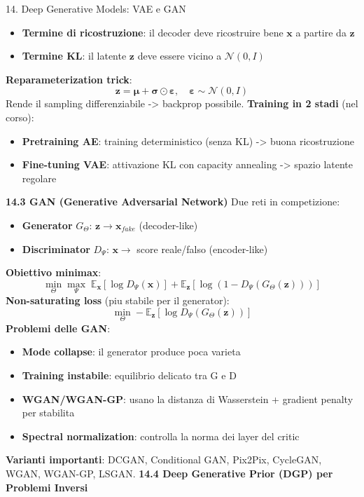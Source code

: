 \documentclass[italian,10pt]{beamer}
\begin{document}
\begin{frame}[allowframebreaks]{14. Deep Generative Models: VAE e GAN}
\begin{itemize}
\item \textbf{Termine di ricostruzione}: il decoder deve ricostruire bene $\boldsymbol{x}$ a partire da $\boldsymbol{z}$
\item \textbf{Termine KL}: il latente $\boldsymbol{z}$ deve essere vicino a $\mathcal{N}(0,I)$
\end{itemize}
\textbf{Reparameterization trick}:
\[ \boldsymbol{z} = \boldsymbol{\mu} + \boldsymbol{\sigma} \odot \boldsymbol{\varepsilon}, \quad \boldsymbol{\varepsilon} \sim \mathcal{N}(0, I) \]
Rende il sampling differenziabile -> backprop possibile.
\textbf{Training in 2 stadi} (nel corso):
\begin{itemize}
\item \textbf{Pretraining AE}: training deterministico (senza KL) -> buona ricostruzione
\item \textbf{Fine-tuning VAE}: attivazione KL con capacity annealing -> spazio latente regolare
\end{itemize}
\textbf{14.3 GAN (Generative Adversarial Network)}
Due reti in competizione:
\begin{itemize}
\item \textbf{Generator} $G_\Theta$: $\boldsymbol{z} \to \boldsymbol{x}_{fake}$ (decoder-like)
\item \textbf{Discriminator} $D_\Psi$: $\boldsymbol{x} \to$ score reale/falso (encoder-like)
\end{itemize}
\textbf{Obiettivo minimax}:
\[ \min_\Theta \max_\Psi \; \mathbb{E}_{\boldsymbol{x}}[\log D_\Psi(\boldsymbol{x})] + \mathbb{E}_{\boldsymbol{z}}[\log(1 - D_\Psi(G_\Theta(\boldsymbol{z})))] \]
\textbf{Non-saturating loss} (piu stabile per il generator):
\[ \min_\Theta -\mathbb{E}_{\boldsymbol{z}}[\log D_\Psi(G_\Theta(\boldsymbol{z}))] \]
\textbf{Problemi delle GAN}:
\begin{itemize}
\item \textbf{Mode collapse}: il generator produce poca varieta
\item \textbf{Training instabile}: equilibrio delicato tra G e D
\item \textbf{WGAN/WGAN-GP}: usano la distanza di Wasserstein + gradient penalty per stabilita
\item \textbf{Spectral normalization}: controlla la norma dei layer del critic
\end{itemize}
\textbf{Varianti importanti}: DCGAN, Conditional GAN, Pix2Pix, CycleGAN, WGAN, WGAN-GP, LSGAN.
\textbf{14.4 Deep Generative Prior (DGP) per Problemi Inversi}

\end{frame}
\end{document}
